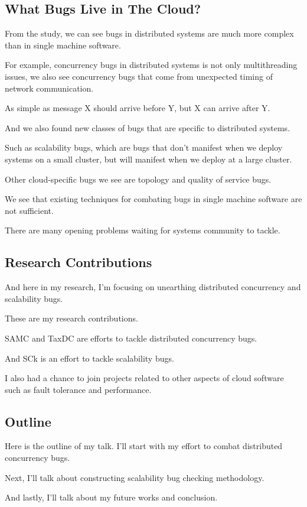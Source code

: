 \subsection{What Bugs Live in The Cloud?}

From the study, we can see bugs in distributed systems are much more complex
than in single machine software.

For example, concurrency bugs in distributed systems is not only multithreading
issues, we also see concurrency bugs that come from unexpected timing of network
communication.

As simple as message X should arrive before Y, but X can arrive after Y.

And we also found new classes of bugs that are specific to distributed systems. 

Such as scalability bugs, which are bugs that don't manifest when we deploy
systems on a small cluster, but will manifest when we deploy at a large cluster.

Other cloud-specific bugs we see are topology and quality of service bugs.

We see that existing techniques for combating bugs in single machine software
are not sufficient.

There are many opening problems waiting for systems community to tackle. 

\subsection{Research Contributions}

And here in my research, I'm focusing on unearthing distributed concurrency and
scalability bugs.

These are my research contributions.

SAMC and TaxDC are efforts to tackle distributed concurrency bugs. 

And SCk is an effort to tackle scalability bugs.

I also had a chance to join projects related to other aspects of cloud software
such as fault tolerance and performance.

\subsection{Outline}

Here is the outline of my talk. I'll start with my effort to combat distributed
concurrency bugs.

Next, I'll talk about constructing scalability bug checking methodology.

And lastly, I'll talk about my future works and conclusion.

